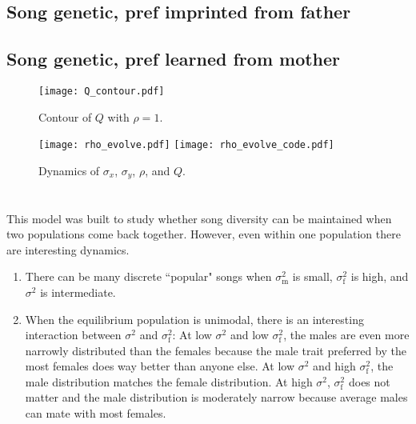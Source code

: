 \documentclass{article}
\begin{document}
\subsection{Song genetic, pref imprinted from father } 
\subsection{Song genetic, pref learned from mother }


\begin{figure}
\texttt{[image: Q\_contour.pdf]}
\caption{\label{Q_contour} Contour of $Q$ with $\rho=1$.}
\end{figure}

\begin{figure}
\texttt{[image: rho\_evolve.pdf]}
\texttt{[image: rho\_evolve\_code.pdf]}
\caption{\label{rho_evolve} Dynamics of $\sigma_x$, $\sigma_y$, $\rho$, and $Q$. }
\end{figure}


\section*{} This model was built to study whether song diversity can be maintained when two populations come back together. However, even within one population there are interesting dynamics.
\begin{enumerate}
\item There can be many discrete ``popular" songs when $\sigma_\text{m}^2$  is small, $\sigma_\text{f}^2$ is high, and $\sigma^2$ is intermediate.
\item When the equilibrium population is unimodal, there is an interesting interaction between $\sigma^2$ and $\sigma_\text{f}^2$: At low $\sigma^2$ and low $\sigma_\text{f}^2$, the males are even more narrowly distributed than the females because the male trait preferred by the most females does way better than anyone else. At low $\sigma^2$ and high $\sigma_\text{f}^2$, the male distribution matches the female distribution. At high $\sigma^2$, $\sigma_\text{f}^2$ does not matter and the male distribution is moderately narrow because average males can mate with most females. 
\end{enumerate}



\end{document}

